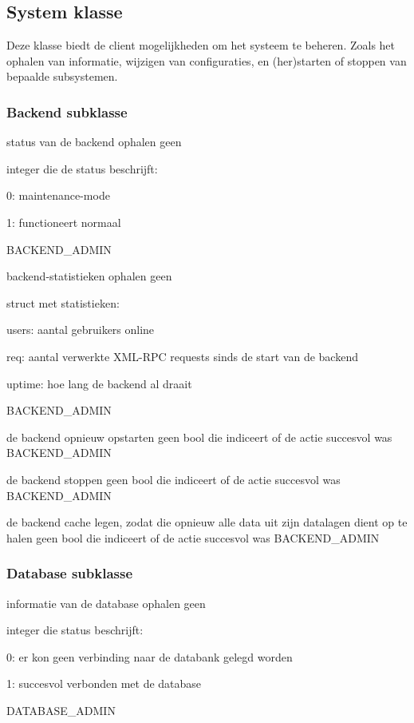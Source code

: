 \subsection{System klasse}

Deze klasse biedt de client mogelijkheden om het systeem te beheren. Zoals het ophalen van informatie, wijzigen van configuraties, en (her)starten of stoppen van bepaalde subsystemen.

\subsubsection{Backend subklasse}

	{ status van de backend ophalen }
	{ geen }
	{ integer die de status beschrijft:
		\begin{itemize_compact}
		\item{0: maintenance-mode}
		\item{1: functioneert normaal}
		\end{itemize_compact} }
	{ BACKEND\_ADMIN }

	{ backend-statistieken ophalen }
	{ geen }
	{ struct met statistieken:
		\begin{itemize_compact}
		\item{users: aantal gebruikers online}
		\item{req: aantal verwerkte XML-RPC requests sinds de start van de backend}
		\item{uptime: hoe lang de backend al draait}
		\end{itemize_compact} }
	{ BACKEND\_ADMIN }

	{ de backend opnieuw opstarten }
	{ geen }
	{ bool die indiceert of de actie succesvol was }
	{ BACKEND\_ADMIN }

	{ de backend stoppen }
	{ geen }
	{ bool die indiceert of de actie succesvol was }
	{ BACKEND\_ADMIN }

	{ de backend cache legen, zodat die opnieuw alle data uit zijn datalagen dient op te halen}
	{ geen }
	{ bool die indiceert of de actie succesvol was }
	{ BACKEND\_ADMIN }


\subsubsection{Database subklasse}

	{ informatie van de database ophalen }
	{ geen }
	{ integer die status beschrijft:
		\begin{itemize_compact}
		\item{0: er kon geen verbinding naar de databank gelegd worden}
		\item{1: succesvol verbonden met de database}
		\end{itemize_compact} }
	{ DATABASE\_ADMIN }

